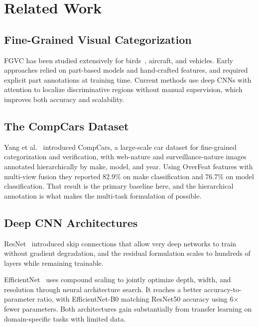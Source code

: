 
\section{Related Work}
\label{sec:related_work}

\subsection{Fine-Grained Visual Categorization}

FGVC has been studied extensively for birds~\cite{WahCUB2002011}, aircraft, and vehicles. Early approaches relied on part-based models and hand-crafted features, and required explicit part annotations at training time. Current methods use deep CNNs with attention to localize discriminative regions without manual supervision, which improves both accuracy and scalability.

\subsection{The CompCars Dataset}

Yang et al.~\cite{Yang2015} introduced CompCars, a large-scale car dataset for fine-grained categorization and verification, with web-nature and surveillance-nature images annotated hierarchically by make, model, and year. Using OverFeat features with multi-view fusion they reported 82.9\% on make classification and 76.7\% on model classification. That result is the primary baseline here, and the hierarchical annotation is what makes the multi-task formulation of  possible.

\subsection{Deep CNN Architectures}

ResNet~\cite{He2016} introduced skip connections that allow very deep networks to train without gradient degradation, and the residual formulation scales to hundreds of layers while remaining trainable.

EfficientNet~\cite{Tan2019} uses compound scaling to jointly optimize depth, width, and resolution through neural architecture search. It reaches a better accuracy-to-parameter ratio, with EfficientNet-B0 matching ResNet50 accuracy using 6$\times$ fewer parameters. Both architectures gain substantially from transfer learning on domain-specific tasks with limited data.

